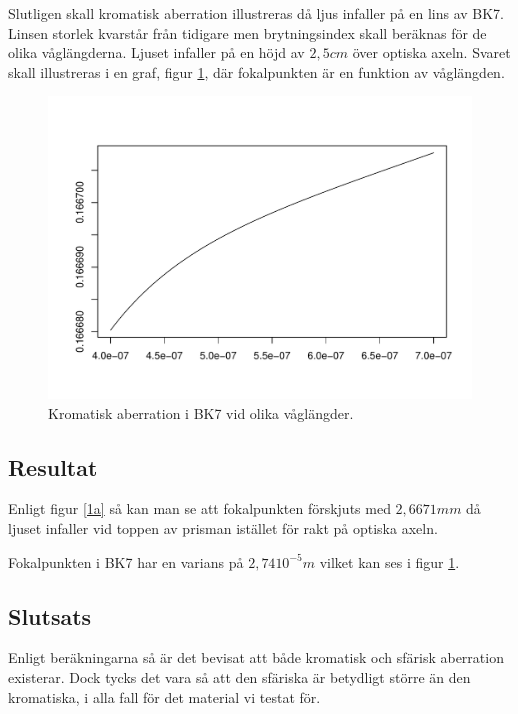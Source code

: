 \documentclass[12pt]{article}
\begin{document}
Slutligen skall kromatisk aberration illustreras då ljus infaller på en lins av BK7. Linsen storlek kvarstår från tidigare men brytningsindex skall beräknas för de olika våglängderna. Ljuset infaller på en höjd av $2,5 cm$ över optiska axeln. Svaret skall illustreras i en graf, figur \ref{1c}, där fokalpunkten är en funktion av våglängden.

\begin{figure}[h!]
  \centering
   \includegraphics[scale=0.6]{BK7_abo.pdf}
	\caption{Kromatisk aberration i BK7 vid olika våglängder.}
	\label{1c}
\end{figure} 

\subsection{Resultat}
Enligt figur \ref{1a} så kan man se att fokalpunkten förskjuts med $2,6671 mm$ då ljuset infaller vid toppen av prisman istället för rakt på optiska axeln.

\noindent
Fokalpunkten i BK7 har en varians på $2,74 10^{-5}m$ vilket kan ses i figur \ref{1c}.



\subsection{Slutsats}
Enligt beräkningarna så är det bevisat att både kromatisk och sfärisk aberration existerar. Dock tycks det vara så att den sfäriska är betydligt större än den kromatiska, i alla fall för det material vi testat för.
\end{document}
